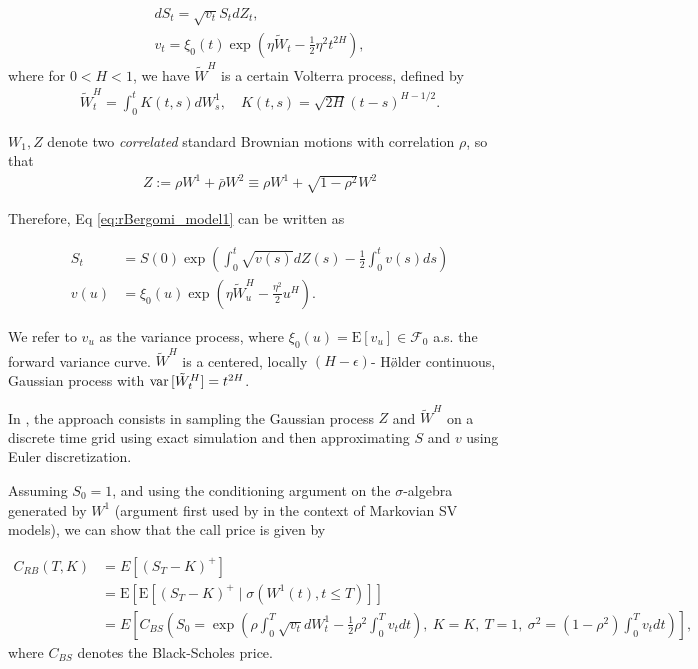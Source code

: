 \documentclass[11pt]{article}
\newcommand{\expt}[1]{\mathrm{E}\left[#1\right]}
\begin{document}
\begin{align}\label{eq:rBergomi_model1}
	dS_t = \sqrt{v_t} S_t dZ_t,\\
	v_t = \xi_0(t) \exp\left( \eta \tilde{W}_t - \frac{1}{2} \eta^2 t^{2H} \right),
\end{align}
where for $0 < H < 1$,  we have $\tilde{W}^H $ is a certain Volterra process,  defined by
\begin{align}
	\tilde{W}_t^H = \int_0^t K(t,s) dW_s^1, \quad K(t,s) = \sqrt{2H} (t-s)^{H - 1/2}.
\end{align}


$W_1, Z$ denote two \emph{correlated} standard Brownian motions with correlation $\rho$, so that
\begin{align}
	Z:=\rho	W^1+ \bar{\rho}W^2 \equiv \rho W^1+\sqrt{1-\rho^2} W^2
\end{align}

Therefore, Eq \ref{eq:rBergomi_model1} can be written as 

\begin{align}\label{eq:rBergomi_model}
	S_t&= S(0)  \operatorname{exp}\left( \int_{0}^{t} \sqrt{v(s)} dZ(s)- \frac{1}{2} \int_{0}^{t} v(s) ds   \right)     \nonumber\\
	v(u)&=\xi_0(u) \operatorname{exp}\left( \eta \tilde{W}_u^H- \frac{\eta^2}{2} u^H \right) .
\end{align}

We refer to $v_u$ as the variance process, where $\xi_0(u) = \expt{v_u} \in \mathcal{F}_0$ a.s. the forward variance curve. $\tilde{W}^H $ is a centered, locally $(H-\epsilon)$- H\" \o lder continuous, Gaussian process with $\operatorname{var}{[\tilde{W}^H_t]} = t^{2H}$.


In \cite{bayer2016pricing}, the  approach consists in sampling the Gaussian process $Z$ and $\tilde{W}^H$ on a discrete time grid using exact simulation and then approximating $S$ and $v$ using Euler  discretization.

Assuming $S_0 = 1$, and using the conditioning argument on the $\sigma$-algebra generated by $W^1$ (argument first used by \cite{romano1997contingent} in the context of Markovian SV
models), we can  show that the call price is given by

\begin{align}\label{BS_formula_rbergomi}
	C_{RB}\left( T, K \right) &= E\left[ \left(S_T - K \right)^+ \right]  \nonumber\\
	&=\expt{\expt{(S_T-K)^+ \mid \sigma(W^1(t) ,t \le T)}}\nonumber \\
	&=E\left[C_{BS}\left( S_0 = \operatorname{exp}\left(\rho \int_0^T \sqrt{v_t} dW_t^1 - \frac{1}{2}
	\rho^2 \int_0^T v_t dt\right),\ K = K, \ T = 1, \ \sigma^2 = (1-\rho^2)
	\int_0^T v_t dt \right) \right],
\end{align}
where $C_{BS}$ denotes the Black-Scholes price.
\end{document}
